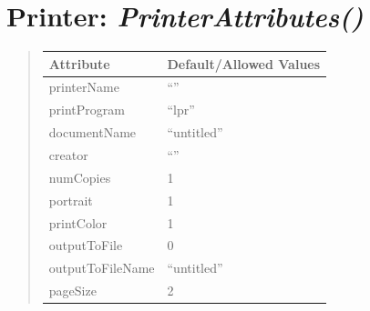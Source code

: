 \documentclass[letterpaper,10pt,english]{sphinxmanual}
\begin{document}
\section{\textbf{Printer}: \emph{PrinterAttributes()}}
\label{attributes:printer-printerattributes}
\begin{DUlineblock}{0em}
\item[] 
\end{DUlineblock}
\begin{quote}

\begin{tabulary}{\linewidth}{|L|L|}
\hline

\textbf{Attribute}
 & 
\textbf{Default/Allowed Values}
\\
\hline
printerName
 & 
``''
\\
\hline
printProgram
 & 
``lpr''
\\
\hline
documentName
 & 
``untitled''
\\
\hline
creator
 & 
``''
\\
\hline
numCopies
 & 
1
\\
\hline
portrait
 & 
1
\\
\hline
printColor
 & 
1
\\
\hline
outputToFile
 & 
0
\\
\hline
outputToFileName
 & 
``untitled''
\\
\hline
pageSize
 & 
2
\\
\hline\end{tabulary}

\end{quote}

\begin{DUlineblock}{0em}
\item[] 
\end{DUlineblock}

\begin{DUlineblock}{0em}
\item[] 
\end{DUlineblock}
\end{document}

